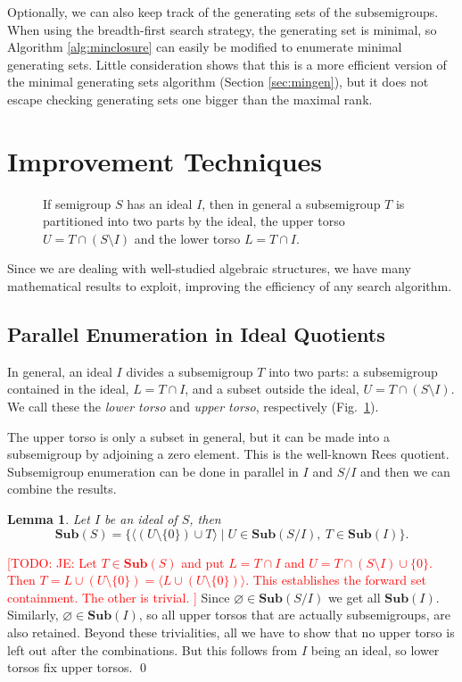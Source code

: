 \documentclass{amsart}
\newcommand{\Sub}{\mathbf{Sub}}
\newcommand{\todo}[1]{\textcolor{red}{ \small \textsf{[TODO:  #1 ]} \normalsize}}
\theoremstyle{plain}
\newtheorem{lemma}[theorem]{Lemma}
\theoremstyle{definition}
\begin{document}
Optionally, we can also keep track of the generating sets of the subsemigroups.
When using the breadth-first search strategy, the generating set is minimal, so Algorithm \ref{alg:minclosure} can easily be modified to enumerate minimal generating sets.
Little consideration shows that this is a more efficient version of the minimal generating sets algorithm (Section \ref{sec:mingen}), but it does not escape checking generating sets one bigger than the maximal rank.

\section{Improvement Techniques}
\label{sec:techniques}

\begin{figure}[t]
\begin{center}

\caption{If semigroup $S$ has an ideal $I$, then in general a subsemigroup $T$ is partitioned into two parts by the ideal, the upper torso $U=T\cap (S\setminus I)$ and the lower torso $L=T\cap I$.}
\label{fig:torsos}
\end{center}
\end{figure}

Since we are dealing with well-studied algebraic structures, we have many mathematical results to exploit, improving the efficiency of any  search algorithm.
\subsection{Parallel Enumeration in Ideal Quotients}
\label{sec:idealparallel}
In general, an ideal $I$ divides a subsemigroup $T$ into two parts: a subsemigroup contained in the ideal, $L=T\cap I$, and a subset outside the ideal, $U=T\cap (S\setminus I)$. We call these the \emph{lower torso} and \emph{upper torso}, respectively (Fig.\ \ref{fig:torsos}).

The upper torso is only a subset in general, but it can be made into a subsemigroup by adjoining a zero element. This is the well-known Rees quotient. 
Subsemigroup enumeration can be done in parallel in $I$ and $S/I$  and then  we can combine the results.

\begin{lemma}
\label{lem:torso}
Let $I$ be an ideal of $S$, then $$\Sub(S)=\big\{\langle (U\setminus\{0\})\cup T \rangle\mid U\in \Sub(S/I),\ T\in\Sub(I)\big\}.$$
\end{lemma}
\proof
\todo{JE: Let $T\in\Sub(S)$ and put $L=T\cap I$ and $U=T\cap(S\setminus I)\cup\{0\}$. Then $T=L\cup(U\setminus \{0\})=\langle L\cup(U\setminus\{0\})\rangle$. This establishes the forward set containment. The other is trivial.}
Since $\varnothing \in \Sub(S/I)$ we get all $\Sub(I)$.
Similarly, $\varnothing \in \Sub(I)$, so all upper torsos that are actually subsemigroups, are also retained.
Beyond these trivialities, all we have to show that no upper torso is left out after the combinations.
But this follows from $I$ being an ideal, so lower torsos fix upper torsos.
\qed
\end{document}
